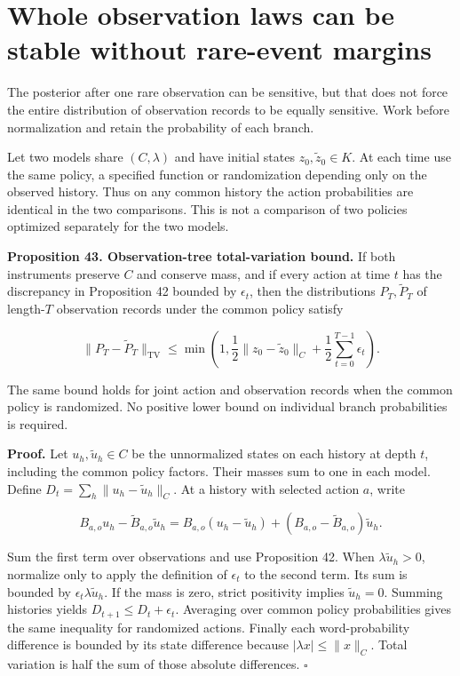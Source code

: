 \section{Whole observation laws can be stable without rare-event margins}\label{LSM:whole-observation-laws-can-be-stable-without-rare-event-margins}

The posterior after one rare observation can be sensitive, but that does
not force the entire distribution of observation records to be equally
sensitive. Work before normalization and retain the probability of each
branch.

Let two models share \((C,\lambda)\) and have initial states
\(z_0,\widetilde z_0\in K\). At each time use the same policy, a
specified function or randomization depending only on the observed
history. Thus on any common history the action probabilities are
identical in the two comparisons. This is not a comparison of two
policies optimized separately for the two models.

\textbf{Proposition 43. Observation-tree total-variation bound.} If both
instruments preserve \(C\) and conserve mass, and if every action at
time \(t\) has the discrepancy in Proposition 42 bounded by
\(\epsilon_t\), then the distributions \(P_T,\widetilde P_T\) of
length-\(T\) observation records under the common policy satisfy

\[
\boxed{
\|P_T-\widetilde P_T\|_{\mathrm{TV}}
\leq\min\left(1,\frac12\|z_0-\widetilde z_0\|_C
+\frac12\sum_{t=0}^{T-1}\epsilon_t\right).
}
\]

The same bound holds for joint action and observation records when the
common policy is randomized. No positive lower bound on individual
branch probabilities is required.

\textbf{Proof.} Let \(u_h,\widetilde u_h\in C\) be the unnormalized
states on each history at depth \(t\), including the common policy
factors. Their masses sum to one in each model. Define
\(D_t=\sum_h\|u_h-\widetilde u_h\|_C\). At a history with selected
action \(a\), write

\[
B_{a,o}u_h-\widetilde B_{a,o}\widetilde u_h
=B_{a,o}(u_h-\widetilde u_h)
+(B_{a,o}-\widetilde B_{a,o})\widetilde u_h.
\]

Sum the first term over observations and use Proposition 42. When
\(\lambda\widetilde u_h>0\), normalize only to apply the definition of
\(\epsilon_t\) to the second term. Its sum is bounded by
\(\epsilon_t\lambda\widetilde u_h\). If the mass is zero, strict
positivity implies \(\widetilde u_h=0\). Summing histories yields
\(D_{t+1}\leq D_t+\epsilon_t\). Averaging over common policy
probabilities gives the same inequality for randomized actions. Finally
each word-probability difference is bounded by its state difference
because \(|\lambda x|\leq\|x\|_C\). Total variation is half the sum of
those absolute differences. \(\square\)


